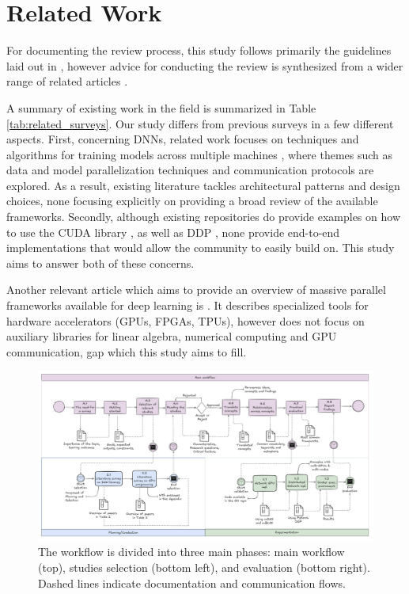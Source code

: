 
\section{Related Work}
\label{sec:related_work}
For documenting the review process, this study follows primarily the guidelines laid out in
\cite{keele_systematic_2007}, however advice for conducting the review is synthesized from a wider
range of related articles
\cite{brereton_lessons_2007-1,kitchenham_procedures_nodate,budgen_reporting_2018,dos_santos_sustainable_2024}.

A summary of existing work in the field is summarized in Table \ref{tab:related_surveys}. Our study
differs from previous surveys in a few different aspects. First, concerning DNNs, related work
focuses on techniques and algorithms for training models across multiple machines
\cite{dehghani_distributed_2023, chahal_hitchhikers_2018, berloco_systematic_2022}, where themes
such as data and model parallelization techniques and communication protocols are explored. As a
result, existing literature tackles architectural patterns and design choices, none focusing
explicitly on providing a broad review of the available frameworks. Secondly, although existing
repositories do provide examples on how to use the CUDA library
\cite{noauthor_nvidiacuda-samples_2025}, as well as DDP
\cite{noauthor_examplesdistributedddpreadmemd_nodate}, none provide end-to-end implementations that
would allow the community to easily build on. This study aims to answer both of these concerns.

Another relevant article which aims to provide an overview of massive parallel frameworks available
for deep learning is \cite{nguyen_machine_2019}. It describes specialized tools for hardware
accelerators (GPUs, FPGAs, TPUs), however does not focus on auxiliary libraries for linear algebra,
numerical computing and GPU communication, gap which this study aims to fill.

\begin{figure}[th]
	\centering
	\includegraphics[width=\linewidth]{figures/workflow2}
	\caption{The workflow is divided into three main phases: main workflow (top), studies selection (bottom left), and
		evaluation (bottom right). Dashed lines indicate documentation and communication flows.}
	\label{fig:workflow}
\end{figure}

